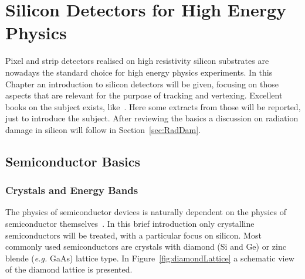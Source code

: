 \chapter{Silicon Detectors for High Energy Physics}
\label{chap:silicon}

Pixel and strip detectors realised on high resistivity silicon substrates are nowadays the standard 
choice for high energy physics experiments. 
In this Chapter an introduction to silicon detectors will be given, focusing 
on those aspects that are relevant for the purpose of tracking and vertexing.
Excellent books on the subject exists, like~\cite{Lutz:411172,Sze1981,Wang1989}. Here 
some extracts from those will be reported, just to introduce the subject. 
After reviewing the basics  a discussion on radiation damage in silicon 
will follow in Section~\ref{sec:RadDam}.
\section{Semiconductor Basics}

\subsection{Crystals and Energy Bands}

The physics of semiconductor devices is naturally dependent on the physics of semiconductor 
themselves~\cite{Sze1981}. In this brief introduction only crystalline semiconductors will be treated, 
with a particular focus on silicon. Most commonly used semiconductors are crystals with 
diamond (Si and Ge) or zinc blende ({\it e.g.} GaAs) lattice type. In Figure~\ref{fig:diamondLattice} 
a schematic view of the diamond lattice is presented.


